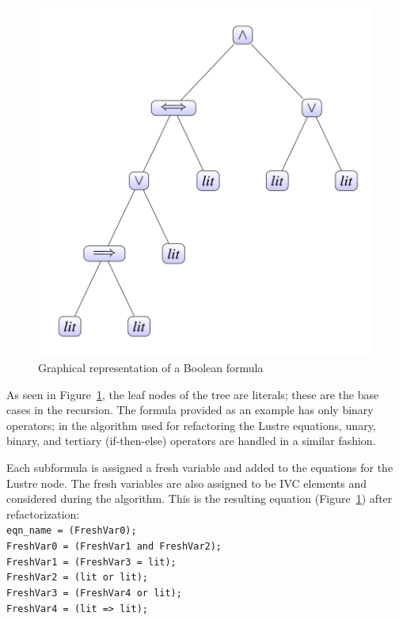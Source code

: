 \begin{figure}[h!]
\begin{center}
\includegraphics[width=.6\textwidth]{images/treeFormula.png}
\caption{Graphical representation of a Boolean formula} 
\label{fig:formulaTree}
\end{center}
\end{figure} 

As seen in Figure~\ref{fig:formulaTree}, the leaf nodes of the tree are literals; these are the base cases in the recursion. The formula provided as an example has only binary operators; in the algorithm used for refactoring the Lustre equations, unary, binary, and tertiary (if-then-else) operators are handled in a similar fashion.

Each subformula is assigned a fresh variable and added to the equations for the Lustre node. The fresh variables are also assigned to be IVC elements and considered during the \aivcalg algorithm. This is the resulting equation (Figure~\ref{fig:formulaTree}) after refactorization:\\
\texttt{eqn\_name = (FreshVar0);}\\
\texttt{FreshVar0 = (FreshVar1 and FreshVar2);}\\
\texttt{FreshVar1 = (FreshVar3 = lit);}\\
\texttt{FreshVar2 = (lit or lit);}\\
\texttt{FreshVar3 = (FreshVar4 or lit);}\\
\texttt{FreshVar4 = (lit => lit);}


